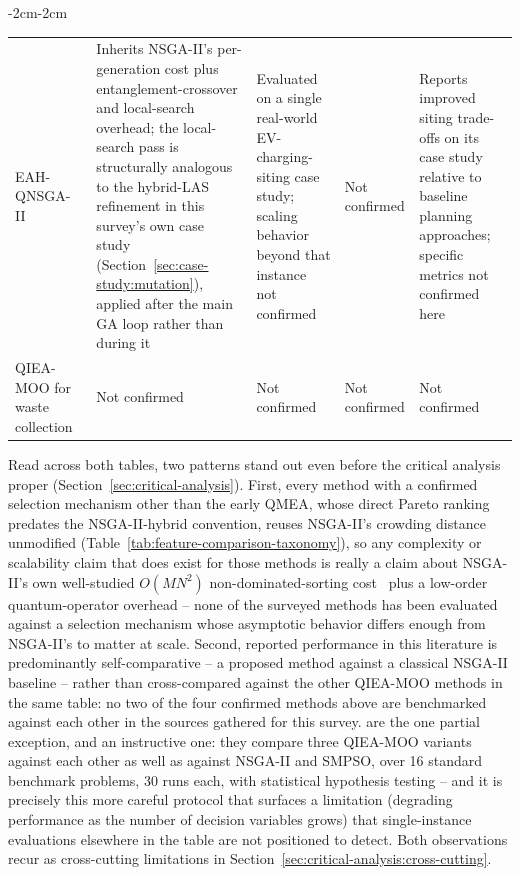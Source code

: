 \begin{table}[htbp]
\begin{adjustwidth}{-2cm}{-2cm}
\begin{tabularx}{\linewidth}{@{}p{2.1cm}XXXX@{}}
    EAH-QNSGA-II~\citep{kumar2026eahqnsga2} &
      Inherits NSGA-II's per-generation cost plus entanglement-crossover
      and local-search overhead; the local-search pass is structurally
      analogous to the hybrid-LAS refinement in this survey's own case
      study (Section~\ref{sec:case-study:mutation}), applied after the
      main GA loop rather than during it &
      Evaluated on a single real-world EV-charging-siting case study;
      scaling behavior beyond that instance not confirmed &
      Not confirmed &
      Reports improved siting trade-offs on its case study relative to
      baseline planning approaches; specific metrics not confirmed here \\
    QIEA-MOO for waste collection~\citep{gilea2026waste} &
      Not confirmed &
      Not confirmed &
      Not confirmed &
      Not confirmed \\
    \bottomrule
  \end{tabularx}
  \end{adjustwidth}
\end{table}

Read across both tables, two patterns stand out even before the
critical analysis proper (Section~\ref{sec:critical-analysis}). First,
every method with a confirmed selection mechanism other than the early
QMEA, whose direct Pareto ranking predates the NSGA-II-hybrid
convention, reuses NSGA-II's crowding distance unmodified
(Table~\ref{tab:feature-comparison-taxonomy}), so any complexity or
scalability claim that does exist for those methods is really a
claim about NSGA-II's own well-studied $O(MN^2)$ non-dominated-sorting
cost~\citep{deb2002nsga2} plus a low-order quantum-operator overhead --
none of the surveyed methods has been evaluated against a
selection mechanism whose asymptotic behavior differs enough from
NSGA-II's to matter at scale. Second, reported performance in this
literature is predominantly self-comparative -- a proposed method
against a classical NSGA-II baseline -- rather than cross-compared
against the other QIEA-MOO methods in the same table: no two of the
four confirmed methods above are benchmarked against each other in the
sources gathered for this survey. \citet{olvera2023continuous} are the
one partial exception, and an instructive one: they compare three
QIEA-MOO variants against each other as well as against NSGA-II and
SMPSO, over 16 standard benchmark problems, 30 runs each, with
statistical hypothesis testing -- and it is precisely this more careful
protocol that surfaces a limitation (degrading performance as the
number of decision variables grows) that single-instance evaluations
elsewhere in the table are not positioned to detect. Both observations
recur as cross-cutting limitations in
Section~\ref{sec:critical-analysis:cross-cutting}.

